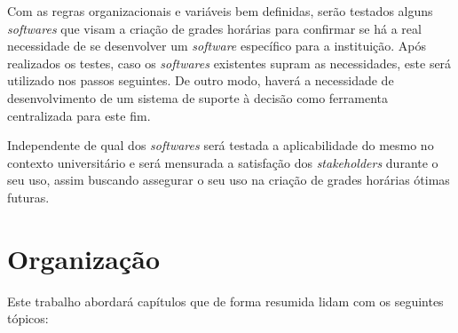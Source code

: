 
Com as regras organizacionais e variáveis bem definidas, serão testados alguns \textit{softwares} que visam a criação de grades horárias para confirmar se há a real necessidade de se desenvolver um \textit{software} específico para a instituição. Após realizados os testes, caso os \textit{softwares} existentes supram as necessidades, este será utilizado nos passos seguintes. De outro modo, haverá a necessidade de desenvolvimento de um sistema de suporte à decisão como ferramenta centralizada para este fim.

Independente de qual dos \textit{softwares} será testada a aplicabilidade do mesmo no contexto universitário e será mensurada a satisfação dos \textit{stakeholders} durante o seu uso, assim buscando assegurar o seu uso na criação de grades horárias ótimas futuras.

\section{Organização} %

Este trabalho abordará capítulos que de forma resumida lidam com os seguintes tópicos:

